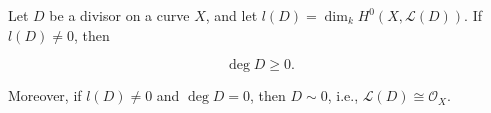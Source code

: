 Let $D$ be a divisor on a curve $X$, and let $l(D) = \dim_k H^0(X, \mathcal{L}(D))$. If $l(D) \neq 0$, then

$$\deg D \geq 0.$$

Moreover, if $l(D) \neq 0$ and $\deg D = 0$, then $D \sim 0$, i.e., $\mathcal{L}(D) \cong \mathcal{O}_X$.
